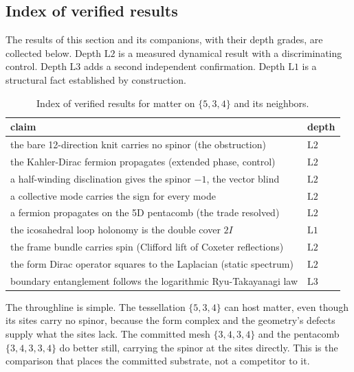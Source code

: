 \subsection{Index of verified results}

The results of this section and its companions, with their depth grades, are collected below. Depth $\mathrm{L}2$ is a measured dynamical result with a discriminating control. Depth $\mathrm{L}3$ adds a second independent confirmation. Depth $\mathrm{L}1$ is a structural fact established by construction.

\begin{table}[ht]
\centering
\begin{tabular}{@{}ll@{}}
\toprule
claim & depth \\
\midrule
the bare 12-direction knit carries no spinor (the obstruction) & $\mathrm{L}2$ \\
the Kahler-Dirac fermion propagates (extended phase, control) & $\mathrm{L}2$ \\
a half-winding disclination gives the spinor $-1$, the vector blind & $\mathrm{L}2$ \\
a collective mode carries the sign for every mode & $\mathrm{L}2$ \\
a fermion propagates on the 5D pentacomb (the trade resolved) & $\mathrm{L}2$ \\
the icosahedral loop holonomy is the double cover $2I$ & $\mathrm{L}1$ \\
the frame bundle carries spin (Clifford lift of Coxeter reflections) & $\mathrm{L}2$ \\
the form Dirac operator squares to the Laplacian (static spectrum) & $\mathrm{L}2$ \\
boundary entanglement follows the logarithmic Ryu-Takayanagi law & $\mathrm{L}3$ \\
\bottomrule
\end{tabular}
\caption{Index of verified results for matter on $\{5,3,4\}$ and its neighbors.}
\label{tab:index-534}
\end{table}

The throughline is simple. The tessellation $\{5,3,4\}$ can host matter, even though its sites carry no spinor, because the form complex and the geometry's defects supply what the sites lack. The committed mesh $\{3,4,3,4\}$ and the pentacomb $\{3,4,3,3,4\}$ do better still, carrying the spinor at the sites directly. This is the comparison that places the committed substrate, not a competitor to it.
